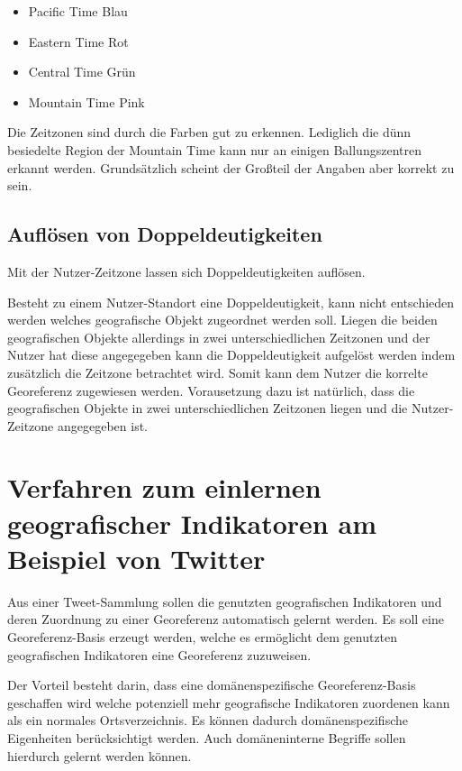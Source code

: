 			\begin{itemize}
			 	\item Pacific Time Blau
			 	\item Eastern Time	Rot
			 	\item Central Time Grün
			 	\item Mountain Time Pink 
			 \end{itemize} 

			 Die Zeitzonen sind durch die Farben gut zu erkennen. 
			 Lediglich die dünn besiedelte Region der Mountain Time kann nur an einigen Ballungszentren erkannt werden. 
			 Grundsätzlich scheint der Großteil der Angaben aber korrekt zu sein.

		\subsection{Auflösen von Doppeldeutigkeiten}

			Mit der Nutzer-Zeitzone lassen sich Doppeldeutigkeiten auflösen. 

			Besteht zu einem Nutzer-Standort eine Doppeldeutigkeit, kann nicht entschieden werden welches geografische Objekt zugeordnet werden soll.
			Liegen die beiden geografischen Objekte allerdings in zwei unterschiedlichen Zeitzonen und der Nutzer hat diese angegegeben kann die Doppeldeutigkeit aufgelöst werden indem zusätzlich die Zeitzone betrachtet wird.
			Somit kann dem Nutzer die korrelte Georeferenz zugewiesen werden.
			Vorausetzung dazu ist natürlich, dass die geografischen Objekte in zwei unterschiedlichen Zeitzonen liegen und die Nutzer-Zeitzone angegegeben ist.

	\section{Verfahren zum einlernen geografischer Indikatoren am Beispiel von Twitter} 

		Aus einer Tweet-Sammlung sollen die genutzten geografischen Indikatoren und deren Zuordnung zu einer Georeferenz automatisch gelernt werden.
		Es soll eine Georeferenz-Basis erzeugt werden, welche es ermöglicht dem genutzten geografischen Indikatoren eine Georeferenz zuzuweisen. 

		Der Vorteil besteht darin, dass eine domänenspezifische Georeferenz-Basis geschaffen wird welche potenziell mehr geografische Indikatoren zuordenen kann als ein normales Ortsverzeichnis.
		Es können dadurch domänenspezifische Eigenheiten berücksichtigt werden. 
		Auch domäneninterne Begriffe sollen hierdurch gelernt werden können. 

